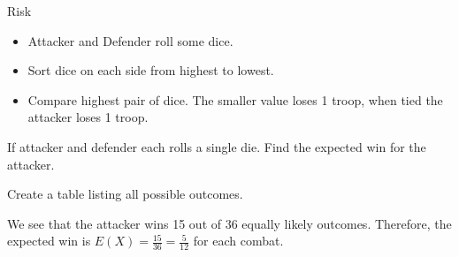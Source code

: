 \begin{frame}{Risk}
\begin{itemize}
\item Attacker and Defender roll some dice. 
\item Sort dice on each side from highest to lowest.
\item Compare highest pair of dice. The smaller value loses 1 troop, when tied the attacker loses 1 troop.
\end{itemize}
\end{frame}


\begin{frame}
\end{frame}

\begin{frame}[t]
\begin{ex}
If attacker and defender each rolls a single die. Find the expected win for the attacker.
\end{ex}
\begin{sol}
Create a table listing all possible outcomes.
\begin{figure}[h!]
\centering
{}
\end{figure}
We see that the attacker wins 15 out of 36 equally likely outcomes. Therefore, the expected win is $E(X) = \tfrac{15}{36} = \tfrac{5}{12}$ for each combat.
\end{sol}
\end{frame}

